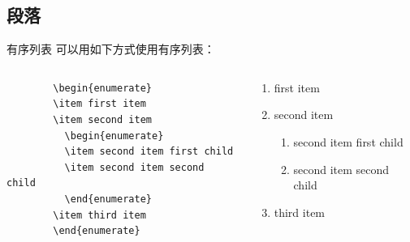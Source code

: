 \documentclass{ctexbeamer}
\begin{document}
\subsection{段落}
\begin{frame}[fragile]{有序列表}
  可以用如下方式使用有序列表：
  \begin{columns}
    \begin{column}{0.6\textwidth}
      \begin{verbatim}
        \begin{enumerate}
        \item first item
        \item second item
          \begin{enumerate}
          \item second item first child
          \item second item second child
          \end{enumerate}
        \item third item
        \end{enumerate}
      \end{verbatim}
    \end{column}
    
    \begin{column}{0.4\textwidth}
      \begin{enumerate}
      \item first item
      \item second item
        \begin{enumerate}
        \item second item first child
        \item second item second child
        \end{enumerate}
      \item third item
      \end{enumerate}
    \end{column}
  \end{columns}
\end{frame}
\end{document}
